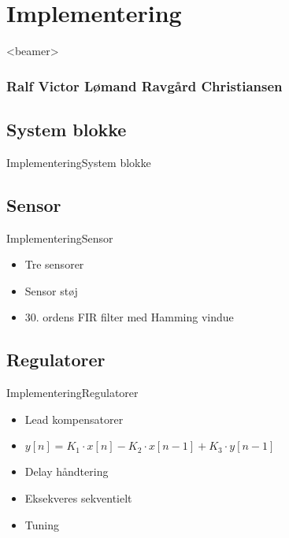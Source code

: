 \section{Implementering}
\begin{frame}<beamer>
\frametitle{Ralf Victor Lømand Ravgård Christiansen}
\tableofcontents[currentsection]
\end{frame}


\subsection{System blokke}
\begin{frame}{Implementering}{System blokke}
\vspace{1.5cm}
\begin{figure}[H]
  \centering
  \scalebox{0.75}{}
\end{figure}

\end{frame}

\subsection{Sensor}
\begin{frame}{Implementering}{Sensor}

  \begin{itemize}
    \item<1-> Tre sensorer
    \item<2-> Sensor støj
    \item<3-> 30. ordens FIR filter med Hamming vindue
  \end{itemize}

\begin{figure}[H]
  \centering
   \scalebox{0.7}{}
\end{figure}
\end{frame}


\subsection{Regulatorer}
\begin{frame}{Implementering}{Regulatorer}

\begin{itemize}
  \item<1-> Lead kompensatorer
  \item<2-> $y[n] = K_1 \cdot x[n] - K_2 \cdot x[n-1] + K_3 \cdot y[n-1]$ 
  \item<3-> Delay håndtering
  \item<4-> Eksekveres sekventielt
  \item<5-> Tuning
\end{itemize}
\end{frame}


